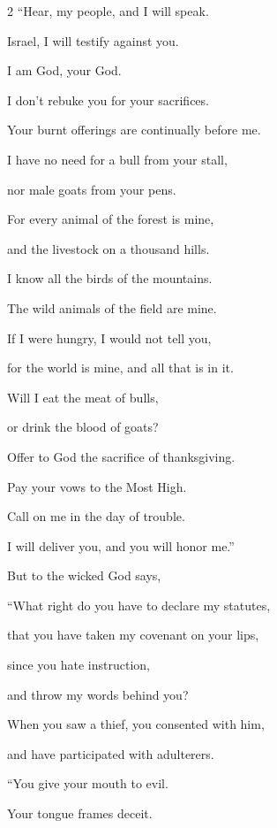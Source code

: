 \begin{multicols}{2}
	\myverse{}“Hear, my people, and I will speak.
	
	Israel, I will testify against you.
	
	I am God, your God.
	
	
	\myverse{}I don’t rebuke you for your sacrifices.
	
	Your burnt offerings are continually before me.
	
	
	\myverse{}I have no need for a bull from your stall,
	
	nor male goats from your pens.
	
	
	\myverse{}For every animal of the forest is mine,
	
	and the livestock on a thousand hills.
	
	
	\myverse{}I know all the birds of the mountains.
	
	The wild animals of the field are mine.
	
	
	\myverse{}If I were hungry, I would not tell you,
	
	for the world is mine, and all that is in it.
	
	
	\myverse{}Will I eat the meat of bulls,
	
	or drink the blood of goats?
	
	
	\myverse{}Offer to God the sacrifice of thanksgiving.
	
	Pay your vows to the Most High.
	
	
	\myverse{}Call on me in the day of trouble.
	
	I will deliver you, and you will honor me.”
	
	\vspace{\baselineskip}
	
	\myverse{}But to the wicked God says,
	
	“What right do you have to declare my statutes,
	
	that you have taken my covenant on your lips,
	
	
	\myverse{}since you hate instruction,
	
	and throw my words behind you?
	
	
	\myverse{}When you saw a thief, you consented with him,
	
	and have participated with adulterers.
	
	\vspace{\baselineskip}
	
	\myverse{}“You give your mouth to evil.
	
	Your tongue frames deceit.
	

\end{multicols}
